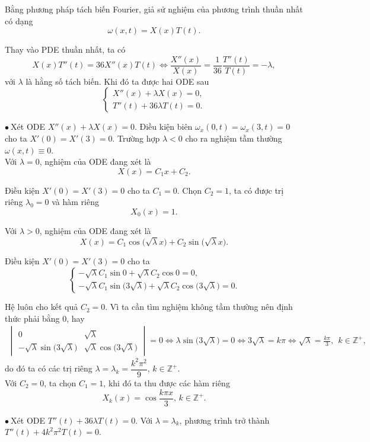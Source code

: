 \documentclass[10pt, a4paper]{article}
\begin{document}
	Bằng phương pháp tách biến Fourier, giả sử nghiệm của phương trình thuần nhất có dạng $$\omega(x,t)=X(x)T(t).$$
	
	Thay vào PDE thuần nhất, ta có $$X(x)T''(t)=36X''(x)T(t)\iff\frac{X''(x)}{X(x)}=\frac{1}{36}\frac{T''(t)}{T(t)}=-\lambda,$$
	với $\lambda$ là hằng số tách biến. Khi đó ta được hai ODE sau $$\begin{cases}
		X''(x)+\lambda X(x)=0,\\
		T''(t)+36\lambda T(t)=0.
	\end{cases}$$
	
	$\bullet~$Xét ODE $X''(x)+\lambda X(x)=0$. Điều kiện biên $\omega_x(0,t)=\omega_x(3,t)=0$ cho ta $X'(0)=X'(3)=0$. Trường hợp $\lambda<0$ cho ra nghiệm tầm thường $\omega(x,t)\equiv0$.\\
	
	Với $\lambda=0$, nghiệm của ODE đang xét là $$X(x)=C_1x+C_2.$$
	
	Điều kiện $X'(0)=X'(3)=0$ cho ta $C_1=0$. Chọn $C_2=1$, ta có được trị riêng $\lambda_0=0$ và hàm riêng $$X_0(x)=1.$$
	
	Với $\lambda>0$, nghiệm của ODE đang xét là $$X(x)=C_1\cos\big(\sqrt\lambda x\big)+C_2\sin\big(\sqrt\lambda x\big).$$
	
	Điều kiện $X'(0)=X'(3)=0$ cho ta $$\begin{cases}
		-\sqrt\lambda C_1\sin0+\sqrt\lambda C_2\cos0=0,\\
		-\sqrt\lambda C_1\sin\big(3\sqrt\lambda\big)+\sqrt\lambda C_2\cos\big(3\sqrt\lambda\big)=0.
	\end{cases}$$
	
	Hệ luôn cho kết quả $C_2=0$. Vì ta cần tìm nghiệm không tầm thường nên định thức phải bằng 0, hay \begin{align*}
		\begin{vmatrix}
			0&\sqrt\lambda\\
			-\sqrt\lambda\sin\big(3\sqrt{\lambda}\big)&\sqrt\lambda\cos\big(3\sqrt{\lambda}\big)
		\end{vmatrix}=0\iff\lambda\sin\big(3\sqrt{\lambda}\big)=0\iff3\sqrt{\lambda}=k\pi\iff\sqrt\lambda=\frac{k\pi}{3},~~k\in\mathbb Z^+,
	\end{align*}
	do đó ta có các trị riêng $\lambda=\lambda_k=\dfrac{k^2\pi^2}{9},\,k\in\mathbb Z^+$.\\
	
	Với $C_2=0$, ta chọn $C_1=1$, khi đó ta thu được các hàm riêng $$X_k(x)=\cos\frac{k\pi x}{3},\,k\in\mathbb Z^+.$$
	
	$\bullet~$Xét ODE $T''(t)+36\lambda T(t)=0$. Với $\lambda=\lambda_k$, phương trình trở thành $T''(t)+4k^2\pi^2T(t)=0$.\\
	
\end{document}
